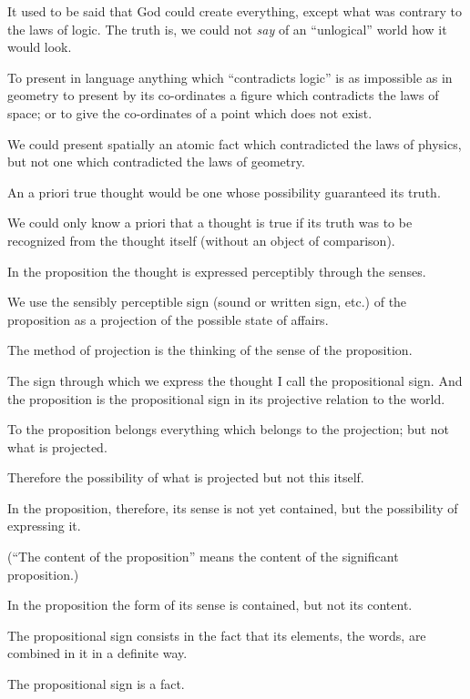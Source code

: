 {It used to be said that God could create everything,
except what was contrary to the laws of logic.
The truth is, we could not \emph{say} of an ``unlogical''
world how it would look.}


{To present in language anything which
``contradicts logic'' is as impossible as in
geometry to present by its co-ordinates a figure
which contradicts the laws of space; or to give
the co-ordinates of a point which does not
exist.}


{We could present spatially an atomic fact which
contradicted the laws of physics, but not one which
contradicted the laws of geometry.}


{An a priori true thought would be one whose
possibility guaranteed its truth.}


{We could only know a priori that a thought
is true if its truth was to be recognized from
the thought itself (without an object of comparison).}


{In the proposition the thought is expressed
perceptibly through the senses.}


{We use the sensibly perceptible sign (sound or
written sign, etc.) of the proposition as a projection
of the possible state of affairs.

The method of projection is the thinking of
the sense of the proposition.}


{The sign through which we express the thought
I call the propositional sign. And the proposition
is the propositional sign in its projective
relation to the world.}


{To the proposition belongs everything which
belongs to the projection; but not what is projected.

Therefore the possibility of what is projected but
not this itself.

In the proposition, therefore, its sense is not yet
contained, but the possibility of expressing it.

(``The content of the proposition'' means the
content of the significant proposition.)

In the proposition the form of its sense is
\enlargethispage{15pt} %
contained, but not its content.}


{The propositional sign consists in the fact that
its elements, the words, are combined in it in a
definite way.

The propositional sign is a fact.}


